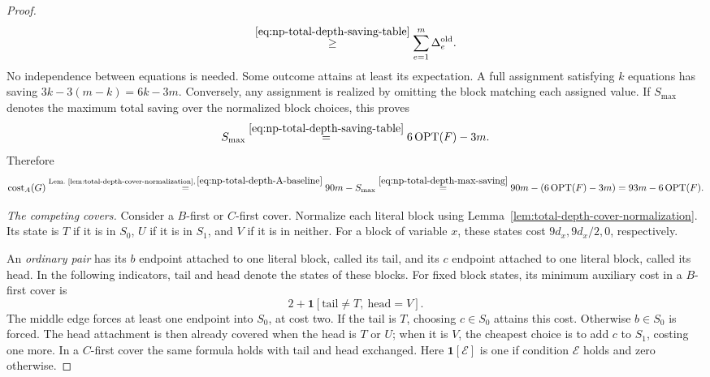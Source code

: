 \begin{proof}
\[ \overset{\eqref{eq:np-total-depth-saving-table}}{\geq}
 \sum_{e=1}^m\Delta_e^{\rm old}.
\]
No independence between equations is needed. Some outcome attains at
least its expectation. A full assignment satisfying
$k$ equations has saving $3k-3(m-k)=6k-3m$. Conversely, any assignment
is realized by omitting the block matching each assigned value. If
$S_{\max}$ denotes the maximum total saving over the normalized block
choices, this proves
\begin{equation}\label{eq:np-total-depth-max-saving}
 S_{\max}\overset{\eqref{eq:np-total-depth-saving-table}}{=}6\operatorname{OPT}(F)-3m.
\end{equation}
Therefore
\begin{equation}\label{eq:np-total-depth-A-cost}
 \operatorname{cost}_A(G)
 \overset{\text{Lem.~\ref{lem:total-depth-cover-normalization}},\,\eqref{eq:np-total-depth-A-baseline}}{=}
   90m-S_{\max}
 \overset{\eqref{eq:np-total-depth-max-saving}}{=}
   90m-(6\operatorname{OPT}(F)-3m)=93m-6\operatorname{OPT}(F).
\end{equation}

\emph{The competing covers.}
Consider a $B$-first or $C$-first cover. Normalize each literal block
using Lemma~\ref{lem:total-depth-cover-normalization}. Its state is
$T$ if it is in $S_0$, $U$ if it is in $S_1$, and $V$ if it is
in neither. For a block of variable $x$, these states cost
$9d_x,9d_x/2,0$, respectively.

An \emph{ordinary pair} has its $b$ endpoint attached to one literal
block, called its tail, and its $c$ endpoint attached to one literal
block, called its head. In the following indicators, $\text{tail}$
and $\text{head}$ denote the states of these blocks. For fixed block
states, its minimum auxiliary cost in a $B$-first cover is
\begin{equation}\label{eq:np-total-depth-rival-pair}
 2+\mathbf1[\text{tail}\ne T,\ \text{head}=V].
\end{equation}
The middle edge forces at least one endpoint into $S_0$, at cost two.
If the tail is $T$, choosing $c\in S_0$ attains this cost. Otherwise
$b\in S_0$ is forced. The head attachment is then already covered
when the head is $T$ or $U$; when it is $V$, the cheapest choice is
to add $c$ to $S_1$, costing one more. In a $C$-first cover the same
formula holds with tail and head exchanged. Here $\mathbf1[\mathcal E]$
is one if condition $\mathcal E$ holds and zero otherwise.


\end{proof}
